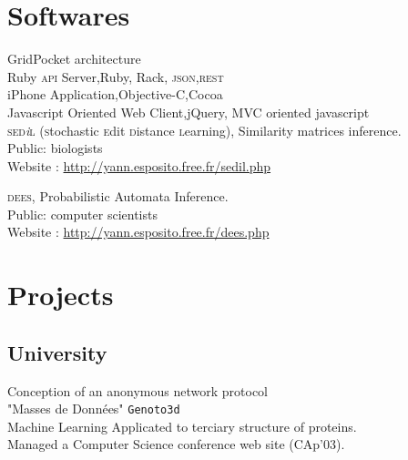 \section*{Softwares}
GridPocket architecture\\
{\footnotesize \phantom{espace}Ruby \textsc{api} Server,\hfill Ruby, Rack, \textsc{json,rest}}\\
{\footnotesize \phantom{espace}iPhone Application,\hfill Objective-C,Cocoa }\\
{\footnotesize \phantom{espace}Javascript Oriented Web Client,\hfill jQuery, MVC oriented javascript}\\

\textsc{sed}\textit{\footnotesize i}\textsc{l} ({\textsc{\color{darkred}s}tochastic 
\textsc{\color{darkred}e}dit
\textsc{\color{darkred}d}{\color{darkred}i}stance
\textsc{\color{darkred}l}earning}), 
Similarity matrices inference.\\
{\footnotesize \phantom{espace}Public: biologists}\\
{\footnotesize \phantom{espace}Website : \href{http://yann.esposito.free.fr/sedil.php}{http://yann.esposito.free.fr/sedil.php}}

\textsc{dees}, Probabilistic Automata Inference.\\
{\footnotesize \phantom{espace}Public: computer scientists}\\
{\footnotesize \phantom{espace}Website : \href{http://yann.esposito.free.fr/dees.php}{http://yann.esposito.free.fr/dees.php}}

\section*{Projects}

\subsection*{University}

\noindent{}Conception of an anonymous network protocol\\
 "Masses de Données" \texttt{Genoto3d}\\
{\phantom{es}\footnotesize Machine Learning Applicated to terciary structure of proteins.}\\
Managed a Computer Science conference web site (CAp'03).

